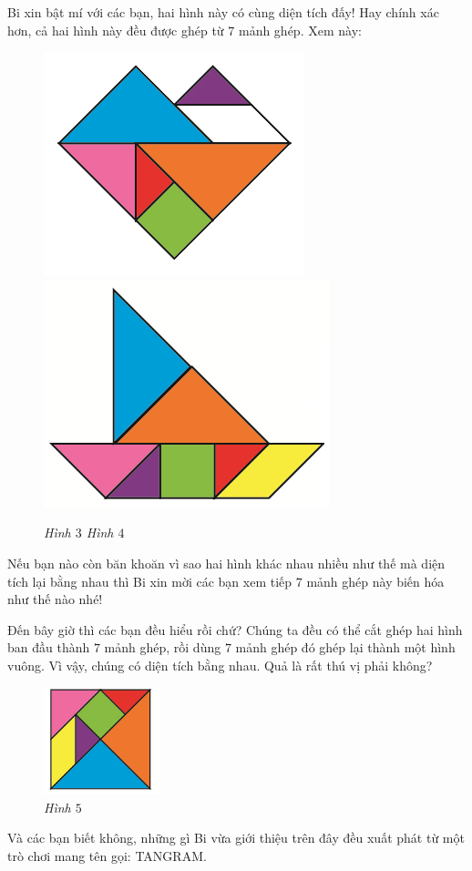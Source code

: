 	\begin{multicols}{2}
		Bi xin bật mí với các bạn, hai hình này có cùng diện tích đấy! Hay chính xác hơn, cả hai hình này đều được ghép từ $7$ mảnh ghép. Xem này:
		\begin{figure}[H]
			\vspace*{5pt}
			\centering
			\captionsetup{labelformat=empty}
			\includegraphics[width=.4\linewidth]{imame3}\includegraphics[width=.4\linewidth]{image4}
			\caption{\small \it Hình $3$\hspace*{30pt} Hình $4$}
			\vspace*{-10pt}
		\end{figure}
	\end{multicols}
	Nếu bạn nào còn băn khoăn vì sao hai hình khác nhau nhiều như thế mà diện tích lại bằng nhau thì Bi xin mời các bạn xem tiếp $7$ mảnh ghép này biến hóa như thế nào nhé!
	\begin{multicols}{2}
		Đến bây giờ thì các bạn đều hiểu rồi chứ? Chúng ta đều có thể cắt ghép hai hình ban đầu thành $7$ mảnh ghép, rồi dùng $7$ mảnh ghép đó ghép lại thành một hình vuông. Vì vậy, chúng có diện tích bằng nhau. Quả là rất thú vị phải không?
		\begin{figure}[H]
			\vspace*{5pt}	
			\captionsetup{labelformat=empty}
			\centering
			\captionsetup{justification=raggedleft}
			\includegraphics[width =0.3\textwidth]{image5}
			\caption{\small\it Hình $5$}
			\vspace*{-10pt}
		\end{figure}
	\end{multicols}
	Và các bạn biết không, những gì Bi vừa giới thiệu trên đây đều xuất phát từ một trò chơi mang tên gọi: TANGRAM.
	
